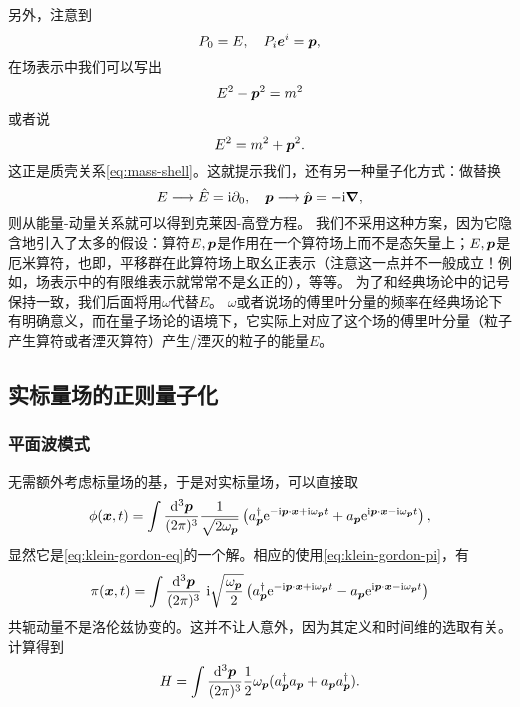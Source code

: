 另外，注意到 %
\[
    P_0 = E, \quad P_i \vb*{e}^i = \vb*{p},
\]
在场表示中我们可以写出
\[
    E^2 - \vb*{p}^2 = m^2
\]
或者说
\[
    E^2 = m^2 + \vb*{p}^2.
\]
这正是质壳关系\eqref{eq:mass-shell}。这就提示我们，还有另一种量子化方式：做替换
\[
    E \longrightarrow \hat{E} = \mathrm{i} \partial_0, \quad \vb*{p} \longrightarrow \hat{\vb*{p}} = - \mathrm{i} \grad,
\]
则从能量-动量关系就可以得到克莱因-高登方程。
我们不采用这种方案，因为它隐含地引入了太多的假设：算符$E, \vb*{p}$是作用在一个算符场上而不是态矢量上；$E,\vb*{p}$是厄米算符，也即，平移群在此算符场上取幺正表示（注意这一点并不一般成立！例如，场表示中的有限维表示就常常不是幺正的），等等。
为了和经典场论中的记号保持一致，我们后面将用$\omega$代替$E$。
$\omega$或者说场的傅里叶分量的频率在经典场论下有明确意义，而在量子场论的语境下，它实际上对应了这个场的傅里叶分量（粒子产生算符或者湮灭算符）产生/湮灭的粒子的能量$E$。

\subsection{实标量场的正则量子化}

\subsubsection{平面波模式}

无需额外考虑标量场的基，于是对实标量场，可以直接取
\begin{equation}
    {\phi}(\vb*{x}, t) = \int \frac{\dd[3]{\vb*{p}}}{(2\pi)^3} \frac{1}{\sqrt{2 \omega_{\vb*{p}}}} \left( {a}^\dagger_{\vb*{p}} \mathrm{e}^{ - \mathrm{i} \vb*{p} \cdot \vb*{x} + \mathrm{i} \omega_{\vb*{p}} t} + {a}_{\vb*{p}} \mathrm{e}^{ \mathrm{i} \vb*{p} \cdot \vb*{x} - \mathrm{i} \omega_{\vb*{p}} t} \right),
    \label{eq:expanding-klein-gordon-field}
\end{equation}
显然它是\eqref{eq:klein-gordon-eq}的一个解。相应的使用\eqref{eq:klein-gordon-pi}，有
\begin{equation}
    {\pi}(\vb*{x}, t) = \int \frac{\dd[3]{\vb*{p}}}{(2\pi)^3} \  \mathrm{i} \sqrt{\frac{\omega_{\vb*{p}}}{2}} \left( {a}^\dagger_{\vb*{p}} \mathrm{e}^{ - \mathrm{i} \vb*{p} \cdot \vb*{x} + \mathrm{i} \omega_{\vb*{p}} t} - {a}_{\vb*{p}} \mathrm{e}^{ \mathrm{i} \vb*{p} \cdot \vb*{x} - \mathrm{i} \omega_{\vb*{p}} t} \right)
\end{equation}
共轭动量不是洛伦兹协变的。这并不让人意外，因为其定义和时间维的选取有关。
计算得到
\[
    {H} = \int \frac{\dd[3]{\vb*{p}}}{(2\pi)^3} \frac{1}{2} \omega_{\vb*{p}} ({a}_{\vb*{p}}^\dagger {a}_{\vb*{p}} + {a}_{\vb*{p}} {a}^\dagger_{\vb*{p}}).
\]


